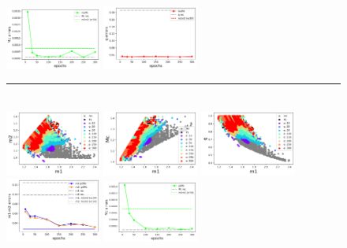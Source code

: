 \documentclass[prd,aps,twocolumn,a4paper,showkeys,nofootinbib]{revtex4-1}
\begin{document}
\begin{figure}[]
  \includegraphics[width=0.28\textwidth]{./Figs/quniform_muMc_err_Mc.png}
  \includegraphics[width=0.28\textwidth]{./Figs/quniform_muMc_err_q.png} \\
  \rule[1ex]{14cm}{0.5pt}\\
  \includegraphics[width=0.28\textwidth]{./Figs/quniform_p3Mc_rainbow_m1m2.png}
  \includegraphics[width=0.28\textwidth]{./Figs/quniform_p3Mc_rainbow_m1Mc.png}
  \includegraphics[width=0.28\textwidth]{./Figs/quniform_p3Mc_rainbow_m1q.png} \\
  \includegraphics[width=0.28\textwidth]{./Figs/quniform_p3Mc_err_m1m2.png}
  \includegraphics[width=0.28\textwidth]{./Figs/quniform_p3Mc_err_Mc.png}

\end{figure}
\end{document}
